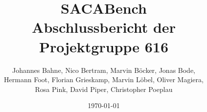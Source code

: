 \title{SACABench\\ Abschlussbericht der Projektgruppe 616}

\author{Johannes Bahne, %
Nico Bertram, %
Marvin Böcker, %
Jonas Bode, \\%
Hermann Foot, %
Florian Grieskamp, %
Marvin Löbel, %
Oliver Magiera, \\%
Rosa Pink, %
David Piper, %
Christopher Poeplau}
\date{\today}

\maketitle